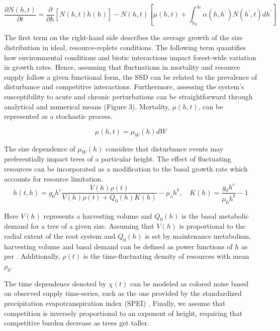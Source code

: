 \begin{equation}
    \dfrac{\partial N(h, t)}{\partial t} = \dfrac{\partial}{\partial h} [N(h, t)\dot{h}(h)] - N(h, t)\left[\mu(h, t) + \int_{h_{0}}^{\infty}\alpha(h, h^{\prime})N(h^{\prime}, t)dh^{\prime} \right]
\end{equation}

The first term on the right-hand side describes the average growth of the size distribution in ideal, resource-replete conditions. The following term quantifies how environmental conditions and biotic interactions impact forest-wide variation in growth rates. Hence, assuming that fluctuations in mortality and resource supply follow a given functional form, the SSD can be related to the prevalence of disturbance and competitive interactions. Furthermore, assessing the system’s susceptibility to acute and chronic perturbations can be straightforward through analytical and numerical means (Figure 3). Mortality, $\mu(h, t)$, can be represented as a stochastic process.

\begin{equation}
     \mu(h, t) = \mu_{W}(h)dW
\end{equation}

The size dependence of $\mu_{W}(h)$ considers that disturbance events may preferentially impact trees of a particular height. The effect of fluctuating resources can be incorporated as a modification to the basal growth rate which accounts for resource limitation.
\begin{equation}
    \dot{h}(t, h) =g_{0}h^{c} \dfrac{V(h)\rho(t)}{V(h)\rho(t) + Q_{0}(h)K(h)} - \mu_{o}h^{b} ,  \quad K(h) =\dfrac{g_{0}h^{c}}{\mu_{0}h^{b}} - 1 
\end{equation}

Here $V(h)$ represents a harvesting volume and $Q_{0}(h)$ is the basal metabolic demand for a tree of a given size. Assuming that $V(h)$ is proportional to the radial extent of the root system and $Q_{0}(h)$ is set by maintenance metabolism,  harvesting volume and basal demand can be defined as power functions of $h$ as per \cite{kempes2011a, niklas_growth_2004}. Additionally, $\rho(t)$ is the time-fluctuating density of resources with mean $\rho_{0}$.

The time dependence denoted by $\chi(t)$ can be modeled as colored noise based on observed supply time-series, such as the one provided by the standardized precipitation evapotranspiration index (SPEI) \cite{begueria_standardized_2014}. Finally, we assume that competition is inversely proportional to an exponent of height, requiring that competitive burden decrease as trees get taller.

